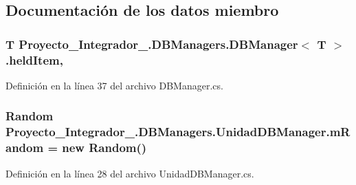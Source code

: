 \subsection{Documentación de los datos miembro}
\hypertarget{class_proyecto___integrador__3_1_1_d_b_managers_1_1_d_b_manager_3_01_t_01_4_a3b67ae3b5b3b9c3793d56c1407d7dcff}{
\subsubsection[{held\-Item}]{\setlength{\rightskip}{0pt plus 5cm}T Proyecto\-\_\-\-Integrador\-\_.\-D\-B\-Managers.\-D\-B\-Manager$<$ T $>$.held\-Item\hspace{0.3cm}{\ttfamily [protected]}, {\ttfamily [inherited]}}}\label{class_proyecto___integrador__3_1_1_d_b_managers_1_1_d_b_manager_3_01_t_01_4_a3b67ae3b5b3b9c3793d56c1407d7dcff}


Definición en la línea 37 del archivo D\-B\-Manager.\-cs.

\hypertarget{class_proyecto___integrador__3_1_1_d_b_managers_1_1_unidad_d_b_manager_a36c1b477b9264ffd517c6d2f736d76f4}{
\subsubsection[{m\-Random}]{\setlength{\rightskip}{0pt plus 5cm}Random Proyecto\-\_\-\-Integrador\-\_.\-D\-B\-Managers.\-Unidad\-D\-B\-Manager.\-m\-Random = new Random()\hspace{0.3cm}{\ttfamily [private]}}}\label{class_proyecto___integrador__3_1_1_d_b_managers_1_1_unidad_d_b_manager_a36c1b477b9264ffd517c6d2f736d76f4}


Definición en la línea 28 del archivo Unidad\-D\-B\-Manager.\-cs.

